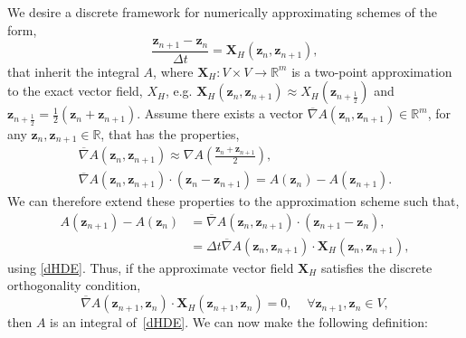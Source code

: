 \documentclass[preprint,12pt]{elsarticle}
\theoremstyle{definition}
\begin{document}
We desire a discrete framework for numerically approximating schemes of the form,
\begin{equation}
  \frac{\boldsymbol{z}_{n+1} - \boldsymbol{z}_{n}}{\Delta t} = \boldsymbol{X}_H \left( \boldsymbol{z}_{n}, \boldsymbol{z}_{n+1} \right),
  \label{dHDE}
\end{equation}
that inherit the integral $A$, where $\boldsymbol{X}_H: V \times V \rightarrow \mathbb{R}^m$ is a two-point approximation to the exact vector field, $X_H$, e.g. $\boldsymbol{X}_H \left( \boldsymbol{z}_{n}, \boldsymbol{z}_{n+1} \right) \approx X_H \left( \boldsymbol{z}_{n+\frac{1}{2}}\right)$ and $\boldsymbol{z}_{n+\frac{1}{2}} = \frac{1}{2}\left(\boldsymbol{z}_{n}+\boldsymbol{z}_{n+1}\right)$. Assume there exists a vector $\overline{\nabla} A \left(\boldsymbol{z}_{n}, \boldsymbol{z}_{n+1}\right) \in \mathbb{R}^m$, for any $\boldsymbol{z}_{n}, \boldsymbol{z}_{n+1} \in \mathbb{R}$, that has the properties,
\begin{gather}
  \overline{\nabla} A \left( \boldsymbol{z}_{n}, \boldsymbol{z}_{n+1} \right) \approx \nabla A \left( \frac{\boldsymbol{z}_{n} + \boldsymbol{z}_{n+1}}{2} \right),\label{Prop1:a}\\
  \overline{\nabla} A \left( \boldsymbol{z}_{n}, \boldsymbol{z}_{n+1} \right) \cdot \left( \boldsymbol{z}_{n}-\boldsymbol{z}_{n+1}\right) = A\left(\boldsymbol{z}_{n}\right) - A\left(\boldsymbol{z}_{n+1}\right).\label{Prop1:b}
\end{gather}
We can therefore extend these properties to the approximation scheme such that,
\begin{align}
  A\left(\boldsymbol{z}_{n+1}\right) - A\left(\boldsymbol{z}_{n}\right) &= \overline{\nabla}A\left(\boldsymbol{z}_{n},\boldsymbol{z}_{n+1}\right) \cdot \left( \boldsymbol{z}_{n+1} - \boldsymbol{z}_{n}\right), \\
  &= \Delta t \overline{\nabla} A \left(\boldsymbol{z}_n, \boldsymbol{z}_{n+1}\right) \cdot \boldsymbol{X}_H \left(\boldsymbol{z}_n , \boldsymbol{z}_{n+1}\right),
  \label{Prop2}
\end{align}
using \eqref{dHDE}. Thus, if the approximate vector field $\boldsymbol{X}_H$ satisfies the discrete orthogonality condition,
\begin{equation}
  \overline{\nabla} A (\boldsymbol{z}_{n+1},\boldsymbol{z}_{n}) \cdot \boldsymbol{X}_H (\boldsymbol{z}_{n+1},\boldsymbol{z}_{n}) = 0, \;\;\;\; \forall \boldsymbol{z}_{n+1},\boldsymbol{z}_{n} \in V,
\end{equation}
then $A$ is an integral of~\eqref{dHDE}. We can now make the following definition:
\end{document}
